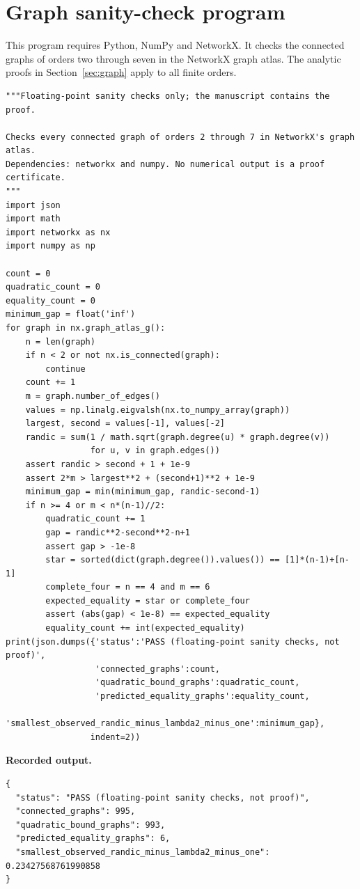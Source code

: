 \documentclass[11pt,a4paper]{article}
\theoremstyle{remark}\newtheorem{remark}[theorem]{Remark}
\numberwithin{equation}{section}
\begin{document}
\section{Graph sanity-check program}\label{app:graph-code}
This program requires Python, NumPy and NetworkX. It checks the connected
graphs of orders two through seven in the NetworkX graph atlas. The
analytic proofs in Section~\ref{sec:graph} apply to all finite orders.
\begin{lstlisting}
"""Floating-point sanity checks only; the manuscript contains the proof.

Checks every connected graph of orders 2 through 7 in NetworkX's graph atlas.
Dependencies: networkx and numpy. No numerical output is a proof certificate.
"""
import json
import math
import networkx as nx
import numpy as np

count = 0
quadratic_count = 0
equality_count = 0
minimum_gap = float('inf')
for graph in nx.graph_atlas_g():
    n = len(graph)
    if n < 2 or not nx.is_connected(graph):
        continue
    count += 1
    m = graph.number_of_edges()
    values = np.linalg.eigvalsh(nx.to_numpy_array(graph))
    largest, second = values[-1], values[-2]
    randic = sum(1 / math.sqrt(graph.degree(u) * graph.degree(v))
                 for u, v in graph.edges())
    assert randic > second + 1 + 1e-9
    assert 2*m > largest**2 + (second+1)**2 + 1e-9
    minimum_gap = min(minimum_gap, randic-second-1)
    if n >= 4 or m < n*(n-1)//2:
        quadratic_count += 1
        gap = randic**2-second**2-n+1
        assert gap > -1e-8
        star = sorted(dict(graph.degree()).values()) == [1]*(n-1)+[n-1]
        complete_four = n == 4 and m == 6
        expected_equality = star or complete_four
        assert (abs(gap) < 1e-8) == expected_equality
        equality_count += int(expected_equality)
print(json.dumps({'status':'PASS (floating-point sanity checks, not proof)',
                  'connected_graphs':count,
                  'quadratic_bound_graphs':quadratic_count,
                  'predicted_equality_graphs':equality_count,
                  'smallest_observed_randic_minus_lambda2_minus_one':minimum_gap},
                 indent=2))
\end{lstlisting}
\noindent\textbf{Recorded output.}
\begin{lstlisting}[language={}]
{
  "status": "PASS (floating-point sanity checks, not proof)",
  "connected_graphs": 995,
  "quadratic_bound_graphs": 993,
  "predicted_equality_graphs": 6,
  "smallest_observed_randic_minus_lambda2_minus_one": 0.23427568761990858
}
\end{lstlisting}
\end{document}
